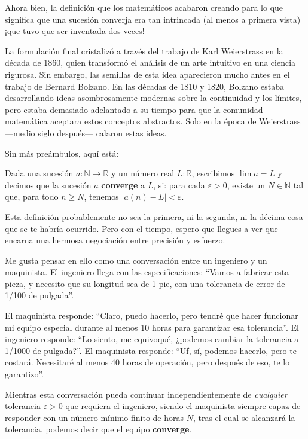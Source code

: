 Ahora bien, la definición que los matemáticos acabaron creando para lo
que significa que una sucesión converja era tan intrincada (al menos a
primera vista) ¡que tuvo que ser inventada dos veces!

La formulación final cristalizó a través del trabajo de Karl Weierstrass
en la década de 1860, quien transformó el análisis de un arte intuitivo
en una ciencia rigurosa. Sin embargo, las semillas de esta idea
aparecieron mucho antes en el trabajo de Bernard Bolzano. En las décadas
de 1810 y 1820, Bolzano estaba desarrollando ideas asombrosamente
modernas sobre la continuidad y los límites, pero estaba demasiado
adelantado a su tiempo para que la comunidad matemática aceptara estos
conceptos abstractos. Solo en la época de Weierstrass —medio siglo
después— calaron estas ideas.

Sin más preámbulos, aquí está:

\begin{definicion}
  Dada una sucesión $a : \mathbb{N} \to \mathbb{R}$ y un número real
  $L : \mathbb{R}$, escribimos $\lim a = L$ y decimos que la sucesión
  $a$ \textbf{converge} a $L$, si: para cada $\varepsilon > 0$, existe un
  $N \in \mathbb{N}$ tal que, para todo $n \geq N$, tenemos $|a(n) - L| < \varepsilon$.
\end{definicion}

Esta definición probablemente no sea la primera, ni la segunda, ni la
décima cosa que se te habría ocurrido. Pero con el tiempo, espero que
llegues a ver que encarna una hermosa negociación entre precisión y
esfuerzo.

Me gusta pensar en ello como una conversación entre un ingeniero y un
maquinista. El ingeniero llega con las especificaciones: ``Vamos a
fabricar esta pieza, y necesito que su longitud sea de 1 pie, con una
tolerancia de error de 1/100 de pulgada''.

El maquinista responde: ``Claro, puedo hacerlo, pero tendré que hacer
funcionar mi equipo especial durante al menos 10 horas para garantizar
esa tolerancia''. El ingeniero responde: ``Lo siento, me equivoqué,
¿podemos cambiar la tolerancia a 1/1000 de pulgada?''. El maquinista
responde: ``Uf, sí, podemos hacerlo, pero te costará. Necesitaré al
menos 40 horas de operación, pero después de eso, te lo garantizo''.

Mientras esta conversación pueda continuar independientemente de
\textit{cualquier} tolerancia $\varepsilon > 0$ que requiera el ingeniero, siendo
el maquinista siempre capaz de responder con un número mínimo finito de
horas $N$, tras el cual se alcanzará la tolerancia, podemos decir que el
equipo \textbf{converge}.

